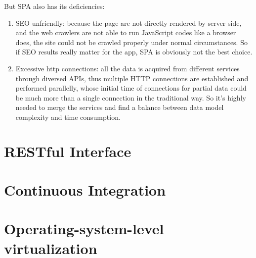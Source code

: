 But SPA also has its deficiencies:

\begin{enumerate}
\item
\gls{SEO} unfriendly: because the page are not directly rendered by server side, and the web crawlers are not able to run JavaScript codes like a browser does, the site could not be crawled properly under normal circumstances. So if SEO results really matter for the app, SPA is obviously not the best choice.
\item
Excessive http connections: all the data is acquired from different services through diversed \gls{API}s, thus multiple HTTP connections are established and performed parallelly, whose initial time of connections for partial data could be much more than a single connection in the traditional way. So it's highly needed to merge the services and find a balance between data model complexity and time consumption.
\end{enumerate}


\section{RESTful Interface}



\section{Continuous Integration}

\section{Operating-system-level virtualization}
